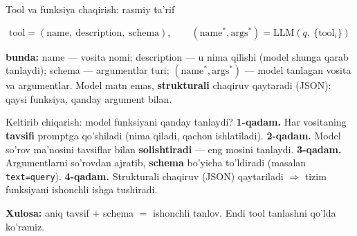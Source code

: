 \documentclass[aspectratio=169,11pt]{beamer}
\newcommand{\bunda}[1]{{\small\textbf{bunda:}\; #1}}
\begin{document}
\begin{frame}{Tool va funksiya chaqirish: rasmiy ta'rif}
  \begin{tcolorbox}[defbox,title={Ta'rif: vosita va tanlov}]
    \vspace{-0.4em}
    $$ \text{tool} = (\text{name},\ \text{description},\ \text{schema}), \qquad
       (\text{name}^*, \text{args}^*) = \mathrm{LLM}(q,\ \{\text{tool}_i\}) $$
  \end{tcolorbox}
  \vspace{2pt}
  \bunda{name --- vosita nomi; description --- u nima qilishi (model shunga
  qarab tanlaydi); schema --- argumentlar turi; $(\text{name}^*,\text{args}^*)$
  --- model tanlagan vosita va argumentlar.}
  \vspace{4pt}
  \footnotesize Model matn emas, \textbf{strukturali} chaqiruv qaytaradi (JSON):
  qaysi funksiya, qanday argument bilan.
\end{frame}

\begin{frame}{Keltirib chiqarish: model funksiyani qanday tanlaydi?}
  \textbf{1-qadam.} Har vositaning \textbf{tavsifi} promptga qo'shiladi
  (nima qiladi, qachon ishlatiladi).
  \pause
  \textbf{2-qadam.} Model so'rov ma'nosini tavsiflar bilan \textbf{solishtiradi}
  --- eng mosini tanlaydi.
  \pause
  \textbf{3-qadam.} Argumentlarni so'rovdan ajratib, \textbf{schema} bo'yicha
  to'ldiradi (masalan \texttt{text=query}).
  \pause
  \textbf{4-qadam.} Strukturali chaqiruv (JSON) qaytariladi $\Rightarrow$ tizim
  funksiyani ishonchli ishga tushiradi.
  \begin{tcolorbox}[okbox,top=2pt,bottom=2pt]
    \small \textbf{Xulosa:} aniq tavsif $+$ schema $=$ ishonchli tanlov.
    Endi tool tanlashni qo'lda ko'ramiz.
  \end{tcolorbox}
\end{frame}
\end{document}
